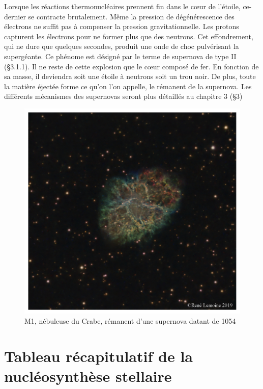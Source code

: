 Lorsque les réactions thermonucléaires prennent fin dans le cœur de l’étoile, ce-dernier se contracte brutalement. Même la pression de dégénérescence des électrons ne suffit pas à compenser la pression gravitationnelle. Les protons capturent les électrons pour ne former plus que des neutrons. Cet effondrement, qui ne dure que quelques secondes, produit une onde de choc pulvérisant la supergéante. Ce phénome est désigné par le terme de supernova de type II (§3.1.1). Il ne reste de cette explosion que le cœur composé de fer. En fonction de sa masse, il deviendra soit une étoile à neutrons soit un trou noir. De plus, toute la matière éjectée forme ce qu’on l’on appelle, le rémanent de la supernova. Les différents mécanismes des supernovas seront plus détaillés au chapitre 3 (§3) \bigskip

\begin{figure}[H]
	\centering
	\includegraphics[scale=0.3]{images/m1}
	\caption{M1, nébuleuse du Crabe, rémanent d'une supernova datant de 1054}
\end{figure}\bigskip 

\section{Tableau récapitulatif de la nucléosynthèse stellaire}

